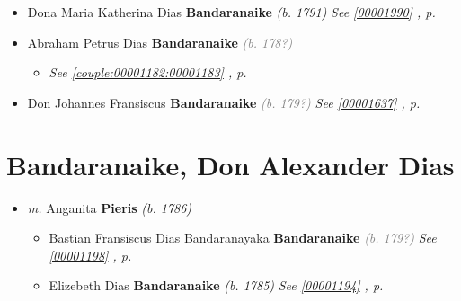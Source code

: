 \documentclass[10pt, openany]{book}
\begin{document}
\begin{itemize}
{\begin{itemize}
{\begin{itemize}
{\begin{itemize}
{   }
\end{itemize}}
\end{itemize}
  }
\item{Dona Maria Katherina Dias \textbf{Bandaranaike} \textcolor{slorange}{\textit{(b. 1791)}} \textcolor{slteal}{\textit{See  \autoref{00001990} \textit{, p. \pageref{00001990} }}}}
\item{Abraham Petrus Dias \textbf{Bandaranaike} \textcolor{gray}{\textit{(b. 178?)}}
\begin{itemize}
\item{\textcolor{slteal}{\textit{See  \autoref{couple:00001182:00001183} \textit{, p. \pageref{couple:00001182:00001183} }}}}
\end{itemize}
   }
\item{Don Johannes Fransiscus \textbf{Bandaranaike} \textcolor{gray}{\textit{(b. 179?)}} \textcolor{slteal}{\textit{See  \autoref{00001637} \textit{, p. \pageref{00001637} }}}}
\end{itemize}}
\end{itemize}
    
\chapter{Bandaranaike, Don Alexander Dias}
\label{00001195}
\textcolor{slmaroon}{\textit{}}
\begin{itemize}
\item{\textit{m.} Anganita \textbf{Pieris} \textcolor{slorange}{\textit{(b. 1786)}}   \label{couple:00001195:00002233} \begin{itemize}
\item{Bastian Fransiscus Dias Bandaranayaka \textbf{Bandaranaike} \textcolor{gray}{\textit{(b. 179?)}} \textcolor{slteal}{\textit{See  \autoref{00001198} \textit{, p. \pageref{00001198} }}}}
\item{Elizebeth Dias \textbf{Bandaranaike} \textcolor{slorange}{\textit{(b. 1785)}} \textcolor{slteal}{\textit{See  \autoref{00001194} \textit{, p. \pageref{00001194} }}}}
\end{itemize}}
\end{itemize}
   
\end{document}
